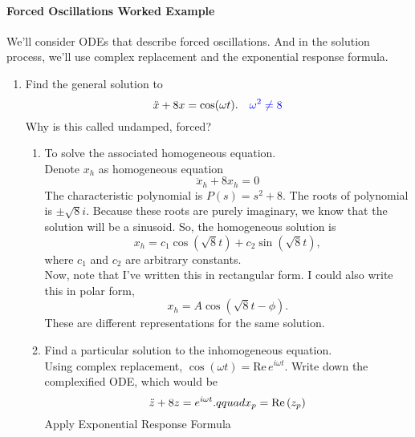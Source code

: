 \paragraph{Forced Oscillations Worked Example}
We'll consider ODEs that describe forced oscillations.
And in the solution process, we'll use complex replacement and the exponential response formula.
\begin{enumerate}[label=\textbf{Part.\arabic*}]
\item Find the general solution to
  \begin{equation*}
    \ddot{x} + 8x = \cos (\omega t). \quad {\color{blue} \omega ^2 \neq 8}
  \end{equation*}
  Why is this called undamped, forced?
  \begin{enumerate}[label=Step.\arabic*]
  \item To solve the associated homogeneous equation. \\
    Denote $x_h$ as homogeneous equation
    \begin{equation*}
      \ddot{x}_h + 8x_h = 0 
    \end{equation*}
    The characteristic polynomial is $P(s) = s^2 + 8$. 
    The roots of polynomial is $\pm \sqrt{8} i$.
    Because these roots are purely imaginary, we know that the solution will be a sinusoid.
    So, the homogeneous solution is
    \begin{equation*}
      x_ h= c_1 \cos (\sqrt{8}t) + c_2 \sin (\sqrt{8}t), 
    \end{equation*}
    where $c_1$ and $c_2$ are arbitrary constants.\\
    Now, note that I've written this in rectangular form.
    I could also write this in polar form,
    \begin{equation*}
      x_ h= A \cos (\sqrt{8}t - \phi). 
    \end{equation*}
    These are different representations for the same solution.
  \item Find a particular solution to the inhomogeneous equation.\\
    Using complex replacement, $\cos (\omega t) = \mathrm{Re\, }e^{i \omega t}$.
    Write down the complexified ODE, which would be
    \begin{equation*}
      \ddot{z} + 8 z = e^{i \omega t}. \\qquad x_ p = \mathrm{Re\, }(z_ p)
    \end{equation*}
    Apply Exponential Response Formula
    \begin{align*}

\end{align*}
\end{enumerate}
\end{enumerate}
